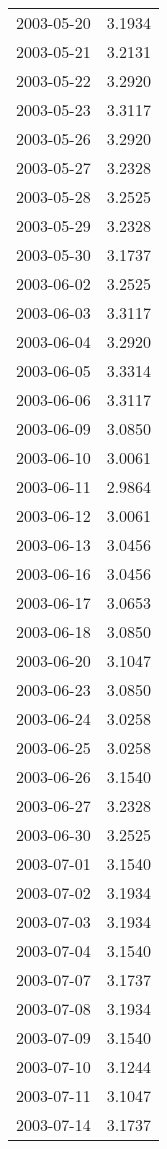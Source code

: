 \begin{tabular}{lr}
2003-05-20 &      3.1934 \\
2003-05-21 &      3.2131 \\
2003-05-22 &      3.2920 \\
2003-05-23 &      3.3117 \\
2003-05-26 &      3.2920 \\
2003-05-27 &      3.2328 \\
2003-05-28 &      3.2525 \\
2003-05-29 &      3.2328 \\
2003-05-30 &      3.1737 \\
2003-06-02 &      3.2525 \\
2003-06-03 &      3.3117 \\
2003-06-04 &      3.2920 \\
2003-06-05 &      3.3314 \\
2003-06-06 &      3.3117 \\
2003-06-09 &      3.0850 \\
2003-06-10 &      3.0061 \\
2003-06-11 &      2.9864 \\
2003-06-12 &      3.0061 \\
2003-06-13 &      3.0456 \\
2003-06-16 &      3.0456 \\
2003-06-17 &      3.0653 \\
2003-06-18 &      3.0850 \\
2003-06-20 &      3.1047 \\
2003-06-23 &      3.0850 \\
2003-06-24 &      3.0258 \\
2003-06-25 &      3.0258 \\
2003-06-26 &      3.1540 \\
2003-06-27 &      3.2328 \\
2003-06-30 &      3.2525 \\
2003-07-01 &      3.1540 \\
2003-07-02 &      3.1934 \\
2003-07-03 &      3.1934 \\
2003-07-04 &      3.1540 \\
2003-07-07 &      3.1737 \\
2003-07-08 &      3.1934 \\
2003-07-09 &      3.1540 \\
2003-07-10 &      3.1244 \\
2003-07-11 &      3.1047 \\
2003-07-14 &      3.1737 \\

\end{tabular}
